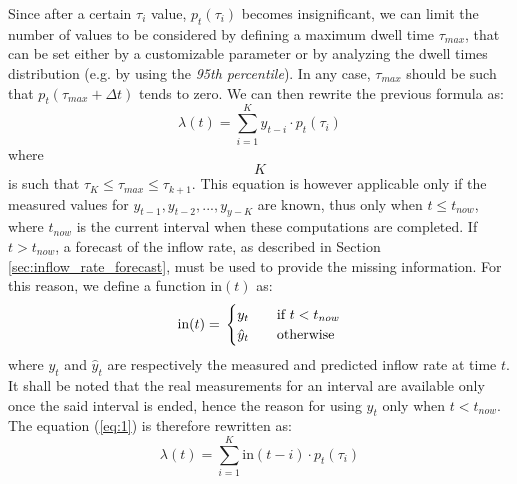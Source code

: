Since after a certain \( \tau_i \) value, \( p_t(\tau_i) \) becomes insignificant, we can limit the number of values to be considered by defining a maximum dwell time \( \tau_{max} \), that can be set either by a customizable parameter or by analyzing the dwell times distribution (e.g. by using the \emph{95th percentile}). In any case, \( \tau_{max} \) should be such that \( p_t(\tau_{max} + \Delta t) \) tends to zero. We can then rewrite the previous formula as:
\begin{equation}
  \lambda(t) = \sum_{i=1}^{K} y_{t-i} \cdot p_t(\tau_i)
  \label{eq:1}
\end{equation}
where $$ K $$ is such that \( \tau_K \leq \tau_{max} \leq \tau_{k+1} \). This equation is however applicable only if the measured values for \( y_{t-1}, y_{t-2}, ..., y_{y-K} \) are known, thus only when \( t \leq t_{now} \), where \( t_{now} \) is the current interval when these computations are completed. If \( t > t_{now} \), a forecast of the inflow rate, as described in Section \ref{sec:inflow_rate_forecast}, must be used to provide the missing information. For this reason, we define a function \( \text{in}(t) \) as:
\begin{equation}
  \text{in}(t) = \\
  \begin{cases}
    y_{t}       & \quad \text{if } t < t_{now} \\
    \hat{y}_{t} & \quad \text{otherwise}
  \end{cases}
\end{equation}
where \( y_t \) and \( \hat{y}_t \) are respectively the measured and predicted inflow rate at time \( t \). It shall be noted that the real measurements for an interval are available only once the said interval is ended, hence the reason for using \( y_t \) only when \( t < t_{now} \). The equation (\ref{eq:1}) is therefore rewritten as:
\begin{equation}
  \lambda(t) = \sum_{i=1}^{K} \text{in}(t-i) \cdot p_t(\tau_i)
\end{equation}

